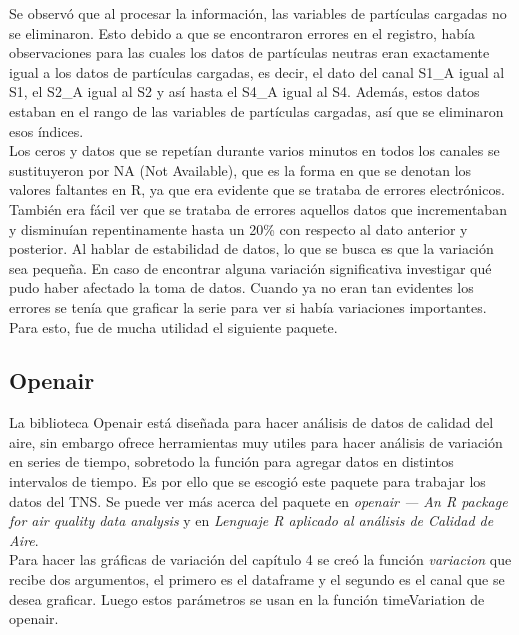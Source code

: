 Se observó que al procesar la información, las variables de partículas cargadas no se eliminaron. Esto debido a que se encontraron errores en el registro, había observaciones para las cuales los datos de partículas neutras eran exactamente igual a los datos de partículas cargadas, es decir, el dato del canal S1\_A igual al S1, el S2\_A igual al S2 y así hasta el S4\_A igual al S4. Además, estos datos estaban en el rango de las variables de partículas cargadas, así que se eliminaron esos índices.\\

Los ceros y datos que se repetían durante varios minutos en todos los canales se sustituyeron por NA (Not Available), que es la forma en que se denotan los valores faltantes en R, ya que era evidente que se trataba de errores electrónicos.\\

También era fácil ver que se trataba de errores aquellos datos que incrementaban y disminuían repentinamente hasta un 20\% con respecto al dato anterior y posterior. Al hablar de estabilidad de datos, lo que se busca es que la variación sea pequeña. En caso de encontrar alguna variación significativa investigar qué pudo haber afectado la toma de datos. Cuando ya no eran tan evidentes los errores se tenía que graficar la serie para ver si había variaciones importantes. Para esto, fue de mucha utilidad el siguiente paquete.

\subsection{Openair}

La biblioteca Openair está diseñada para hacer análisis de datos de calidad del aire, sin embargo ofrece herramientas muy utiles para hacer análisis de variación en series de tiempo, sobretodo la función para agregar datos en distintos intervalos de tiempo. Es por ello que se escogió este paquete para trabajar los datos del TNS. Se puede ver más acerca del paquete en \emph{openair --- An R package for air quality data analysis}\cite{openair} y en \emph{Lenguaje R aplicado al análisis de Calidad de Aire}\cite{manualOp}.\\

Para hacer las gráficas de variación del capítulo 4 se creó la función \emph{variacion} que recibe dos argumentos, el primero es el dataframe y el segundo es el canal que se desea graficar. Luego estos parámetros se usan en la función timeVariation de openair.

